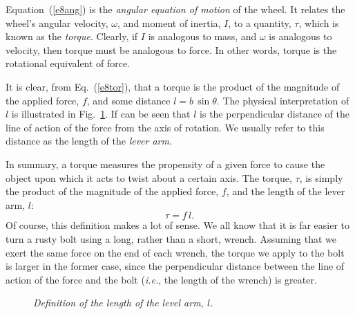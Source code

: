 Equation~(\ref{e8ang}) is the {\em angular equation of motion} of the wheel. It relates the
wheel's angular velocity, $\omega$,  and moment of inertia, $I$, to a quantity, $\tau$, which is known
as
the {\em torque}. Clearly, if $I$ is analogous to mass, and $\omega$ is analogous to velocity, then
torque must be analogous to force. In other words, torque is the rotational equivalent of
force. 

It is clear, from Eq.~(\ref{e8tor}), that a torque is the product of the magnitude
of the applied force, $f$, and some distance $l=b\,\sin\theta$. The physical interpretation
of $l$ is illustrated in Fig.~\ref{f81}. If can be seen that $l$ is the 
perpendicular distance of the line of action of the force from the axis of rotation.
We usually refer to this distance as the length of the {\em lever arm}. 

In summary,
a torque measures the propensity of a given force to cause the object upon which
it acts to twist about a certain axis. The torque, $\tau$, is simply the product of the magnitude
of the applied force, $f$,  and the length of the lever arm, $l$:
\begin{equation}\label{etdef}
\tau = f\,l.
\end{equation}
Of course, this definition makes a lot of sense. We all know that it is far easier to turn a
rusty bolt using a long, rather than a short, wrench. Assuming that we exert
the same force on the end of each wrench, the torque we apply to the bolt is larger in the
former case, since the perpendicular distance between the line of action
of the force and the bolt ({\em i.e.}, the length of the wrench) is greater.

\begin{figure}
\epsfysize=3in
\centerline{}
\caption{\em Definition of the length of the level arm, $l$.}\label{f81}  
\end{figure}

